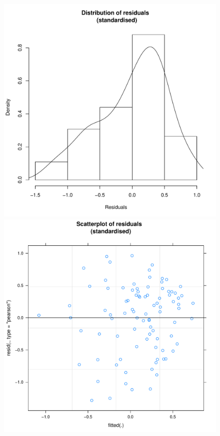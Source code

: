 \begin{CJK}{UTF8}{gbsn}
            \begin{figure}[!htbp]
              \includegraphics[scale =.4]{images/MLM3aOutHist.pdf}
              \includegraphics[scale =.4]{images/MLM3aOutScatter.pdf}

\end{figure}
\end{CJK}
